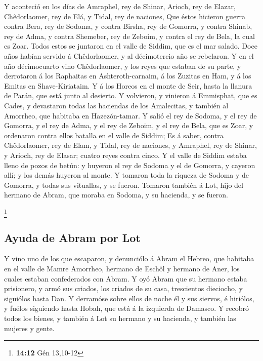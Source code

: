  Y aconteció en los días de Amraphel, rey de Shinar, Arioch,
rey de Elazar, Chêdorlaomer, rey de Elá, y Tidal, rey de naciones,
 Que éstos hicieron guerra contra Bera, rey de Sodoma, y
contra Birsha, rey de Gomorra, y contra Shinab, rey de Adma, y contra
Shemeber, rey de Zeboim, y contra el rey de Bela, la cual es Zoar.
 Todos estos se juntaron en el valle de Siddim, que es el
mar salado.  Doce años habían servido á Chêdorlaomer, y al
décimotercio año se rebelaron.  Y en el año décimocuarto
vino Chêdorlaomer, y los reyes que estaban de su parte, y derrotaron á
los Raphaitas en Ashteroth-carnaim, á los Zuzitas en Ham, y á los Emitas
en Shave-Kiriataim.  Y á los Horeos en el monte de Seir,
hasta la llanura de Parán, que está junto al desierto.  Y
volvieron, y vinieron á Emmisphat, que es Cades, y devastaron todas las
haciendas de los Amalecitas, y también al Amorrheo, que habitaba en
Hazezón-tamar.  Y salió el rey de Sodoma, y el rey de
Gomorra, y el rey de Adma, y el rey de Zeboim, y el rey de Bela, que es
Zoar, y ordenaron contra ellos batalla en el valle de Siddim;
 Es á saber, contra Chêdorlaomer, rey de Elam, y Tidal, rey
de naciones, y Amraphel, rey de Shinar, y Arioch, rey de Elasar; cuatro
reyes contra cinco.  Y el valle de Siddim estaba lleno de
pozos de betún: y huyeron el rey de Sodoma y el de Gomorra, y cayeron
allí; y los demás huyeron al monte.  Y tomaron toda la
riqueza de Sodoma y de Gomorra, y todas sus vituallas, y se fueron.
 Tomaron también á Lot, hijo del hermano de Abram, que
moraba en Sodoma, y su hacienda, y se fueron.

\footnote{\textbf{14:12} Gén 13,10-12}

\hypertarget{ayuda-de-abram-por-lot}{%
\subsection{Ayuda de Abram por Lot}\label{ayuda-de-abram-por-lot}}

 Y vino uno de los que escaparon, y denunciólo á Abram el
Hebreo, que habitaba en el valle de Mamre Amorrheo, hermano de Eschôl y
hermano de Aner, los cuales estaban confederados con Abram.
 Y oyó Abram que su hermano estaba prisionero, y armó sus
criados, los criados de su casa, trescientos dieciocho, y siguiólos
hasta Dan.  Y derramóse sobre ellos de noche él y sus
siervos, é hiriólos, y fuélos siguiendo hasta Hobah, que está á la
izquierda de Damasco.  Y recobró todos los bienes, y
también á Lot su hermano y su hacienda, y también las mujeres y gente.

